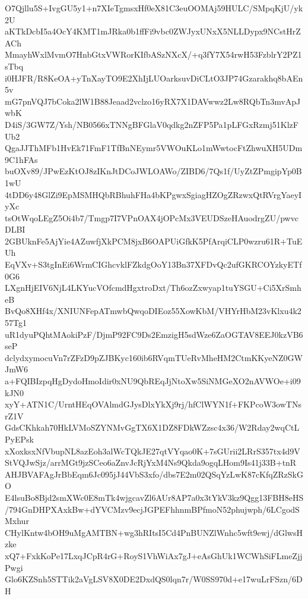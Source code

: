 O7Qjllu5S+IvgGU5y1+n7XIeTgmsxHf0eX81C3euOOMAj59HULC/SMpqKjU/yk2U
aKTkDcbI5a4OcY4KMT1mJRka0b1ffFi9vbc0ZWJyxUNxX5NLLDypx9NCstHrZACh
MmayhWxlMvmO7HnbGtxVWRorKIfbASzNXcX/+q3fY7X54rwH53FzblrY2PZ1sTbq
i0HJFR/R8KeOA+yTnXayTO9E2XhIjLUOarksuvDiCLtO3JP74Gzarakhq8bAEn5v
mG7pnVQJ7bCoka2lW1B88Jeaad2vclzo16yRX7X1DAVwwz2Lw8RQbTn3mvApJwbK
D4iS/3GW7Z/Ysh/NB0566xTNNgBFGlaV0qdkg2nZFP5Pa1pLFGxRzmj51KlzFUb2
QgaJJThMFb1HvEk71FmF1TfBnNEymr5VWOuKLo1mWwtocFtZhwuXH5UDm9C1hFAs
buOXv89/JPwEzKtOJ8zIKnJtDCoJWLOAWo/ZIBD6/7Qs1f/UyZtZPmgipYp0B1wU
4tDD6y48GlZi9EpMSMHQbRBhuhFHa4bKPgwxSgiagHZOgZRzwxQtRVrgYaeyIyXc
tsOtWqoLEgZ5Oi4b7/Tmgp7I7VPnOAX4jOPcMx3VEUDSzeHAuodrgZU/pwvcDLBI
2GBUknFe5AjYie4AZuwfjXkPCM8jxB6OAPUiGfkK5PfArqiCLP0wzru61R+TuEUh
EqVXv+S3tgInEi6WrmCIGhcvklFZkdgOoY13Bn37XFDvQc2ufGKRCOYzkyETf0G6
LXgnHjEIV6NjL4LKYucVOfcmdHgxtroDxt/Th6ozZxwyap1tuYSGU+Ci5XrSmheB
BvQo8XHf4x/XNIUNFepATmwbQwqoDIEoz55XowKbM/VHYrHbM23vKlxu4k257Tg1
uR1dyuPQhtMAokiPzF/DjmP92FC9Ds2EmzigH5sdWze6ZaOGTAV8EEJ0kzVB6seP
dclydxymocuVn7rZFzD9pZJBKyc160ib6RVqmTUeRvMheHM2CtmKKyeNZ0GWJmW6
a+FQIBIzpqHgDydoHmoIdir0xNU9QbREqJjNtoXw5SiNMGeXO2nAVWOe+i09kJN0
xyY+ATN1C/UrntHEqOVAlmdGJysDlxYkXj9rj/hfClWYN1f+FKPcoW3owTNsrZ1V
GdsCKhkah70HkLVMoSZYNMvGgTX6X1DZ8FDkWZzsc4x36/W2Rday2wqCtLPyEPsk
xXoxksxNfVbupNL8azEoh3alWcTQkJE27qtVYqao0K+7sGUrii2LRrS357tx4d9V
StVQJwSjz/arrMGt9jzSCeo6aZnvJcRjYxM4Ns9Qkda9ogqLHom9Is41j33B+tnR
AHJBVAFAgJrBbEqm6Jc095jJ44VbS3xfo/dbs7E2m02QSqYzLwK87cKfqZRzSkGO
E4lsuBo8Bjd2smXWc0E8mTk4wjgcavZl6AUr8AP7a0x3tYkV3kz9Qgg13FBH8eHS
/794GnDHPXAxkBw+dYVCMzv9ecjJGPEFhhnmBPfmoN52phujwph/6LCgodSMxhur
CHylKntw4bOH9uMgAMTBN+wg3hRItsI5Cd4PnBUNZlWnhc5wft9ewj/dGlwsHzke
xQ7+FxkKoPe17LxqJCpR4rG+RoyS1VhWiAx7gJ+eAsGhUk1WCWhSiFLmeZjjPwgi
Glo6KZSnh5STTik2aVgLSV8X0DE2DxdQS0lqn7r/W0SS970d+e17wuLrFSzn/6DH
